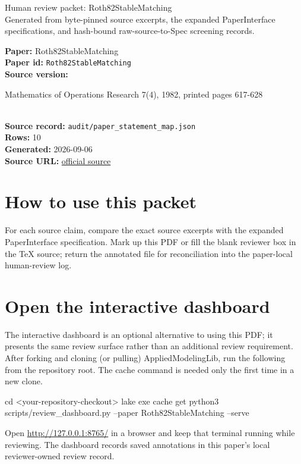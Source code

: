 \documentclass[10pt]{article}
\begin{document}
\fontsize{9}{10}\selectfont

\begin{center}
{\LARGE Human review packet: Roth82StableMatching}\\[0.35em]
\small Generated from byte-pinned source excerpts, the expanded PaperInterface
specifications, and hash-bound raw-source-to-Spec screening records.
\end{center}

\noindent\textbf{Paper:} Roth82StableMatching\\
\textbf{Paper id:} \texttt{Roth82StableMatching}\\
\textbf{Source version:} \parbox[t]{0.76\linewidth}{\raggedright Mathematics of Operations Research 7(4), 1982, printed pages 617-628}\\
\textbf{Source record:} \texttt{audit/paper\_statement\_map.json}\\
\textbf{Rows:} 10\\
\textbf{Generated:} 2026-09-06\\
\textbf{Source URL:} \href{https://doi.org/10.1287/moor.7.4.617}{official source}





\section*{How to use this packet}
For each source claim, compare the exact source excerpts with the expanded
PaperInterface specification. Mark up this PDF or fill the blank reviewer box in the TeX source;
return the annotated file for reconciliation into the paper-local human-review
log.

\section*{Open the interactive dashboard}
The interactive dashboard is an optional alternative to using this PDF; it
presents the same review surface rather than an additional review requirement.
After forking and cloning (or pulling) AppliedModelingLib, run the following from the
repository root. The cache command is needed only the first time in a new clone.
\begin{ReviewVerbatim}
cd <your-repository-checkout>
lake exe cache get
python3 scripts/review_dashboard.py --paper Roth82StableMatching --serve
\end{ReviewVerbatim}
Open \url{http://127.0.0.1:8765/} in a browser and keep that terminal running
while reviewing. The dashboard records saved annotations in this paper's local
reviewer-owned review record.
\end{document}

